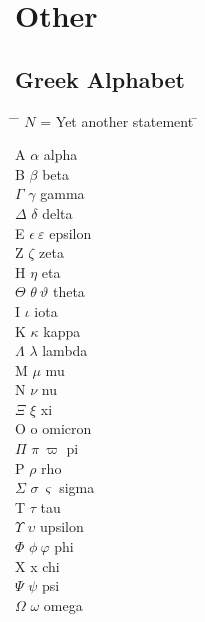 \chapter{Other}

\section{Greek Alphabet}

\begin{tabbing}
	\hspace{2em} \= \hspace{3em} \= $N$ = Yet another statement \= \kill
	
	A           \>  $\alpha$                 \>  alpha    \\
	B           \>  $\beta$                  \>  beta     \\
	$\Gamma$    \>  $\gamma$                 \>  gamma    \\
	$\Delta$    \>  $\delta$                 \>  delta    \\
	E           \>  $\epsilon \ \varepsilon$ \>  epsilon  \\
	Z           \>  $\zeta$                  \>  zeta     \\
	H           \>  $\eta$                   \>  eta      \\
	$\Theta$    \>  $\theta \ \vartheta $    \>  theta    \\
	I           \>  $\iota$                  \>  iota     \\
	K           \>  $\kappa$                 \>  kappa    \\
	$\Lambda$   \>  $\lambda$                \>  lambda   \\
	M           \>  $\mu$                    \>  mu       \\
	N           \>  $\nu$                    \>  nu       \\
	$\Xi$       \>  $\xi$                    \>  xi       \\
	O           \>  o                        \>  omicron  \\
	$\Pi$       \>  $\pi \ \varpi $          \>  pi       \\
	P           \>  $\rho$                   \>  rho      \\
	$\Sigma$    \>  $\sigma \ \varsigma $    \>  sigma    \\
	T           \>  $\tau$                   \>  tau      \\
	$\Upsilon$  \>  $\upsilon$               \>  upsilon  \\
	$\Phi$      \>  $\phi \ \varphi $        \>  phi      \\
	X           \>  x                        \>  chi      \\
	$\Psi$      \>  $\psi$                   \>  psi      \\
	$\Omega$    \>  $\omega$                 \>  omega    \\
	
\end{tabbing}

